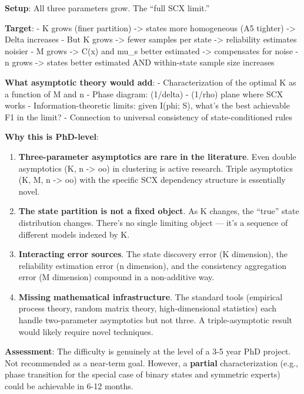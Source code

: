 \documentclass[
  12pt,
]{ctexart}
\begin{document}
\textbf{Setup}: All three parameters grow. The ``full SCX limit.''

\textbf{Target}: - K grows (finer partition) -\textgreater{} states more
homogeneous (A5 tighter) -\textgreater{} Delta increases - But K grows
-\textgreater{} fewer samples per state -\textgreater{} reliability
estimates noisier - M grows -\textgreater{} C(x) and mu\_s better
estimated -\textgreater{} compensates for noise - n grows
-\textgreater{} states better estimated AND within-state sample size
increases

\textbf{What asymptotic theory would add}: - Characterization of the
optimal K as a function of M and n - Phase diagram: (1/delta) - (1/rho)
plane where SCX works - Information-theoretic limits: given I(phi; S),
what's the best achievable F1 in the limit? - Connection to universal
consistency of state-conditioned rules

\textbf{Why this is PhD-level}:

\begin{enumerate}
\def\labelenumi{\arabic{enumi}.}
\item
  \textbf{Three-parameter asymptotics are rare in the literature}. Even
  double asymptotics (K, n -\textgreater{} oo) in clustering is active
  research. Triple asymptotics (K, M, n -\textgreater{} oo) with the
  specific SCX dependency structure is essentially novel.
\item
  \textbf{The state partition is not a fixed object}. As K changes, the
  ``true'' state distribution changes. There's no single limiting object
  --- it's a sequence of different models indexed by K.
\item
  \textbf{Interacting error sources}. The state discovery error (K
  dimension), the reliability estimation error (n dimension), and the
  consistency aggregation error (M dimension) compound in a non-additive
  way.
\item
  \textbf{Missing mathematical infrastructure}. The standard tools
  (empirical process theory, random matrix theory, high-dimensional
  statistics) each handle two-parameter asymptotics but not three. A
  triple-asymptotic result would likely require novel techniques.
\end{enumerate}

\textbf{Assessment}: The difficulty is genuinely at the level of a 3-5
year PhD project. Not recommended as a near-term goal. However, a
\textbf{partial} characterization (e.g., phase transition for the
special case of binary states and symmetric experts) could be achievable
in 6-12 months.
\end{document}
